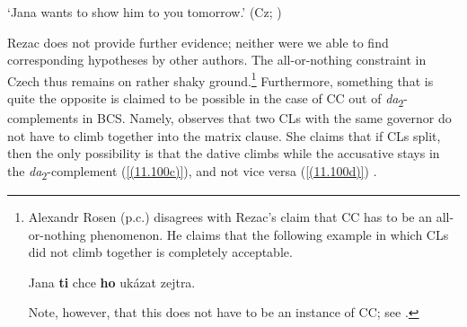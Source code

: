 \begin{exe}\ex\label{rezacsexamples}
\begin{xlist}
\end{xlist}
\glt ‘Jana wants to show him to you tomorrow.’
\hfill (Cz; \citealt[8]{Rezac05})
\end{exe}

\noindent Rezac does not provide further evidence; neither were we able to find corresponding hypotheses by other authors. The all-or-nothing constraint in Czech thus remains on rather shaky ground.\footnote{Alexandr Rosen (p.c.) disagrees with Rezac’s claim that CC has to be an all-or-nothing phenomenon. He claims that the following example in which CLs did not climb together is completely acceptable.

\begin{exe}\ex\label{(11.99d)}
Jana \textbf{ti} chce \textbf{ho} ukázat zejtra.
\hfill 
\end{exe}

Note, however, that this does not have to be an instance of CC; see \citet[67]{Junghanns02}.
} Furthermore, something that is quite the opposite is claimed to be possible in the case of CC out of \textit{da}\textsubscript{2}-complements in BCS. Namely, \citet[182]{Stjepanovic04} observes that two CLs with the same governor do not have to climb together into the matrix clause. She claims that if CLs split, then the only possibility is that the dative climbs while the accusative stays in the \textit{da}\textsubscript{2}-complement (\ref{(11.100c)}), and not vice versa (\ref{(11.100d)}) \citep[cf.][182]{Stjepanovic04}.

